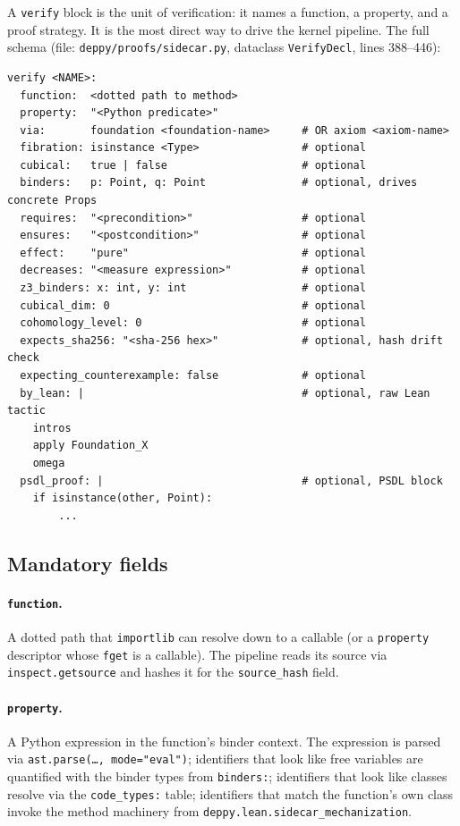 A \texttt{verify} block is the unit of verification: it names a
function, a property, and a proof strategy.  It is the most direct
way to drive the kernel pipeline.  The full schema (file:
\texttt{deppy/proofs/sidecar.py}, dataclass \texttt{VerifyDecl},
lines 388--446):

\begin{lstlisting}[language=deppyfile,caption={Schema of a
\texttt{verify} block (all fields shown; only \texttt{function} and
\texttt{property} are mandatory).}]
verify <NAME>:
  function:  <dotted path to method>
  property:  "<Python predicate>"
  via:       foundation <foundation-name>     # OR axiom <axiom-name>
  fibration: isinstance <Type>                # optional
  cubical:   true | false                     # optional
  binders:   p: Point, q: Point               # optional, drives concrete Props
  requires:  "<precondition>"                 # optional
  ensures:   "<postcondition>"                # optional
  effect:    "pure"                           # optional
  decreases: "<measure expression>"           # optional
  z3_binders: x: int, y: int                  # optional
  cubical_dim: 0                              # optional
  cohomology_level: 0                         # optional
  expects_sha256: "<sha-256 hex>"             # optional, hash drift check
  expecting_counterexample: false             # optional
  by_lean: |                                  # optional, raw Lean tactic
    intros
    apply Foundation_X
    omega
  psdl_proof: |                               # optional, PSDL block
    if isinstance(other, Point):
        ...
\end{lstlisting}

\subsection{Mandatory fields}

\paragraph{\texttt{function}.}  A dotted path that
\texttt{importlib} can resolve down to a callable (or a
\texttt{property} descriptor whose \texttt{fget} is a callable).
The pipeline reads its source via \texttt{inspect.getsource} and
hashes it for the \texttt{source\_hash} field.

\paragraph{\texttt{property}.}  A Python expression in the function's
binder context.  The expression is parsed via
\texttt{ast.parse(\dots, mode="eval")}; identifiers that look like
free variables are quantified with the binder types from
\texttt{binders:}; identifiers that look like classes resolve via
the \texttt{code\_types:} table; identifiers that match the function's
own class invoke the method machinery from
\texttt{deppy.lean.sidecar\_mechanization}.


